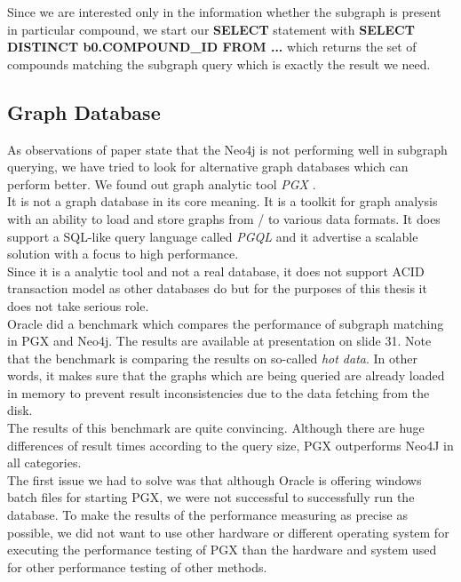 {Since we are interested only in the information whether the subgraph is present in particular compound, we start our \textbf{SELECT} statement with \textbf{SELECT DISTINCT b0.COMPOUND\_ID FROM ...} which returns the set of compounds matching the subgraph query which is exactly the result we need.

\subsection{Graph Database}

As observations of paper \cite{Hoksza} state that the Neo4j is not performing well in subgraph querying, we have tried to look for alternative graph databases which can perform better. We found out graph analytic tool \textit{PGX} \cite{pgx}.\\

It is not a graph database in its core meaning. It is a toolkit for graph analysis with an ability to load and store graphs from / to various data formats. It does support a SQL-like query language called \textit{PGQL} \cite{pgql} and it advertise a scalable solution with a focus to high performance.\\

Since it is a analytic tool and not a real database, it does not support ACID transaction model as other databases do but for the purposes of this thesis it does not take serious role.\\

Oracle did a benchmark which compares the performance of subgraph matching in PGX and Neo4j. The results are available at presentation \cite{pgx-neo4j} on slide 31. Note that the benchmark is comparing the results on so-called \textit{hot data}. In other words, it makes sure that the graphs which are being queried are already loaded in memory to prevent result inconsistencies due to the data fetching from the disk.\\

The results of this benchmark are quite convincing. Although there are huge differences of result times according to the query size, PGX outperforms Neo4J in all categories.\\

The first issue we had to solve was that although Oracle is offering windows batch files for starting PGX, we were not successful to successfully run the database. To make the results of the performance measuring as precise as possible, we did not want to use other hardware or different operating system for executing the performance testing of PGX than the hardware and system used for other performance testing of other methods.\\

}
